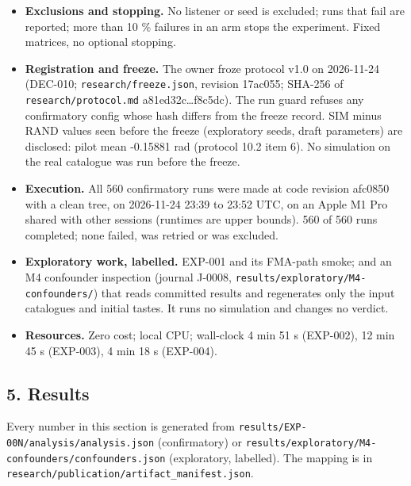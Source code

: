 \documentclass[
]{article}
\begin{document}
\begin{itemize}
  opposite sign with a CI excluding 0 or is practically equivalent to 0;
  partially robust otherwise. A second check compares oracle and
  estimated profiles. EXP-004: replicates if Delta\_FMA has the EXP-002
  sign with a CI excluding 0; does not replicate if its CI excludes 0
  with the opposite sign or it is practically equivalent to 0; otherwise
  inconclusive.
\item
  \textbf{Exclusions and stopping.} No listener or seed is excluded;
  runs that fail are reported; more than 10 \% failures in an arm stops
  the experiment. Fixed matrices, no optional stopping.
\item
  \textbf{Registration and freeze.} The owner froze protocol v1.0 on
  2026-11-24 (DEC-010; \texttt{research/freeze.json}, revision 17ac055;
  SHA-256 of \texttt{research/protocol.md} a81ed32c\ldots f8c5dc). The
  run guard refuses any confirmatory config whose hash differs from the
  freeze record. SIM minus RAND values seen before the freeze
  (exploratory seeds, draft parameters) are disclosed: pilot mean
  -0.15881 rad (protocol 10.2 item 6). No simulation on the real
  catalogue was run before the freeze.
\item
  \textbf{Execution.} All 560 confirmatory runs were made at code
  revision afc0850 with a clean tree, on 2026-11-24 23:39 to 23:52 UTC,
  on an Apple M1 Pro shared with other sessions (runtimes are upper
  bounds). 560 of 560 runs completed; none failed, was retried or was
  excluded.
\item
  \textbf{Exploratory work, labelled.} EXP-001 and its FMA-path smoke;
  and an M4 confounder inspection (journal J-0008,
  \texttt{results/exploratory/M4-confounders/}) that reads committed
  results and regenerates only the input catalogues and initial tastes.
  It runs no simulation and changes no verdict.
\item
  \textbf{Resources.} Zero cost; local CPU; wall-clock 4 min 51 s
  (EXP-002), 12 min 45 s (EXP-003), 4 min 18 s (EXP-004).
\end{itemize}

\subsection{5. Results}\label{results}

Every number in this section is generated from
\texttt{results/EXP-00N/analysis/analysis.json} (confirmatory) or
\texttt{results/exploratory/M4-confounders/confounders.json}
(exploratory, labelled). The mapping is in
\texttt{research/publication/artifact\_manifest.json}.
\end{document}

